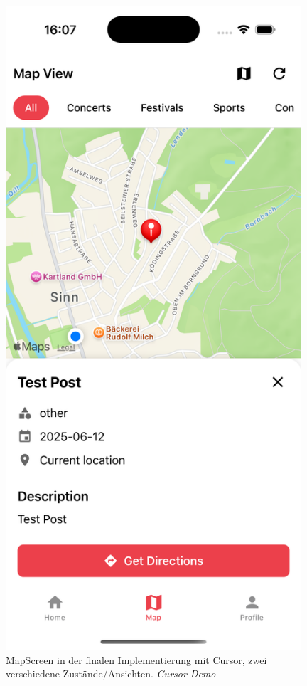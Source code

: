 \begin{figure}[htbp]
\begin{minipage}{0.48\textwidth}
      \end{minipage}
      \hfill
      \begin{minipage}{0.48\textwidth}
            \centering
            \includegraphics[width=0.98\textwidth]{images/cursor_screenshots/final-mapscreen-cursor-2.png}
      \end{minipage}
      \caption{MapScreen in der finalen Implementierung mit Cursor, zwei verschiedene Zustände/Ansichten. \textit{Cursor-Demo}}
      \label{fig:cursor-finalpair}
\end{figure}

